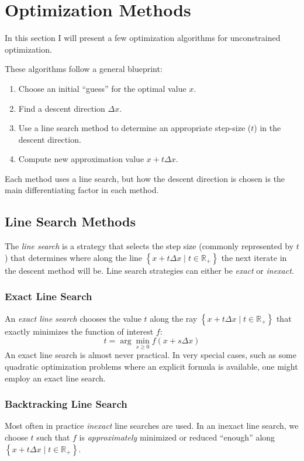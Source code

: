 \section{Optimization Methods}

In this section I will present a few optimization algorithms for unconstrained optimization.

These algorithms follow a general blueprint:
\begin{enumerate}
	\item Choose an initial ``guess'' for the optimal value $x$.
	\item Find a descent direction $\Delta x$.
	\item Use a line search method to determine an appropriate step-size ($t$) in the descent direction.
	\item Compute new approximation value $x+t\Delta x$.
\end{enumerate}

Each method uses a line search, but how the descent direction is chosen is the main differentiating factor in each method.

\subsection{Line Search Methods}

The \textit{line search} is a strategy that selects the step size (commonly represented by $t$) that determines where along the line $\left\lbrace x+t\Delta x\mid t\in\mathbb{R}_+\right\rbrace$ the next iterate in the descent method will be. Line search strategies can either be \textit{exact} or \textit{inexact}.

\subsubsection*{Exact Line Search}

An \textit{exact line search} chooses the value $t$ along the ray $\left\lbrace x+t\Delta x\mid t\in\mathbb{R}_+\right\rbrace$ that exactly minimizes the function of interest $f$:
$$t=\arg\min_{s\geq 0}f(x+s\Delta x)$$
An exact line search is almost never practical. In very special cases, such as some quadratic optimization problems where an explicit formula is available, one might employ an exact line search.

\subsubsection*{Backtracking Line Search}
Most often in practice \textit{inexact} line searches are used. In an inexact line search, we choose $t$ such that $f$ is \textit{approximately} minimized or reduced ``enough'' along $\left\lbrace x+t\Delta x\mid t\in\mathbb{R}_+\right\rbrace$.

